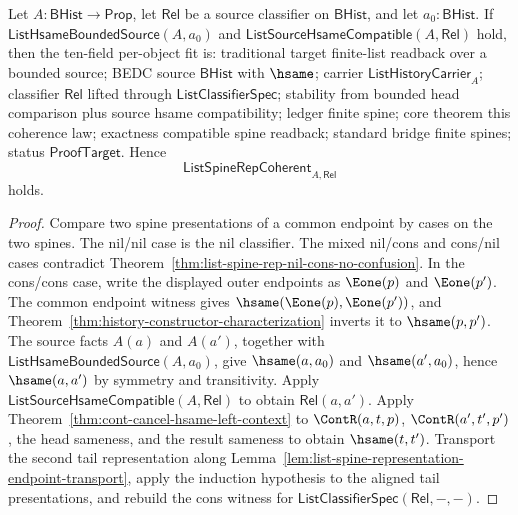 \begin{theorem}
\label{thm:list-hsame-compatible-bounded-source-spine-coherence}
Let $A:\mathsf{BHist}\to\mathsf{Prop}$, let $\mathsf{Rel}$ be a source
classifier on $\mathsf{BHist}$, and let $a_0:\mathsf{BHist}$. If
$\mathsf{ListHsameBoundedSource}(A,a_0)$ and
$\mathsf{ListSourceHsameCompatible}(A,\mathsf{Rel})$ hold, then the ten-field
per-object fit is: traditional target finite-list readback over a bounded
source; BEDC source $\mathsf{BHist}$ with $\hsame$; carrier
$\mathsf{ListHistoryCarrier}_A$; classifier $\mathsf{Rel}$ lifted through
$\mathsf{ListClassifierSpec}$; stability from bounded head comparison plus
source hsame compatibility; ledger finite spine; core theorem this coherence
law; exactness compatible spine readback; standard bridge finite spines; status
$\mathsf{ProofTarget}$. Hence
$$
\mathsf{ListSpineRepCoherent}_{A,\mathsf{Rel}}
$$
holds.
\end{theorem}
\begin{proof}
Compare two spine presentations of a common endpoint by cases on the two
spines. The nil/nil case is the nil classifier. The mixed nil/cons and cons/nil
cases contradict Theorem~\ref{thm:list-spine-rep-nil-cons-no-confusion}. In the
cons/cons case, write the displayed outer endpoints as $\Eone(p)$ and
$\Eone(p')$. The common endpoint witness gives
$\hsame(\Eone(p),\Eone(p'))$, and
Theorem~\ref{thm:history-constructor-characterization} inverts it to
$\hsame(p,p')$. The source facts $A(a)$ and $A(a')$, together with
$\mathsf{ListHsameBoundedSource}(A,a_0)$, give $\hsame(a,a_0)$ and
$\hsame(a',a_0)$, hence $\hsame(a,a')$ by symmetry and transitivity. Apply
$\mathsf{ListSourceHsameCompatible}(A,\mathsf{Rel})$ to obtain
$\mathsf{Rel}(a,a')$. Apply
Theorem~\ref{thm:cont-cancel-hsame-left-context} to $\ContR(a,t,p)$,
$\ContR(a',t',p')$, the head sameness, and the result sameness to obtain
$\hsame(t,t')$. Transport the second tail representation along
Lemma~\ref{lem:list-spine-representation-endpoint-transport}, apply the
induction hypothesis to the aligned tail presentations, and rebuild the cons
witness for $\mathsf{ListClassifierSpec}(\mathsf{Rel},-,-)$.
\end{proof}

